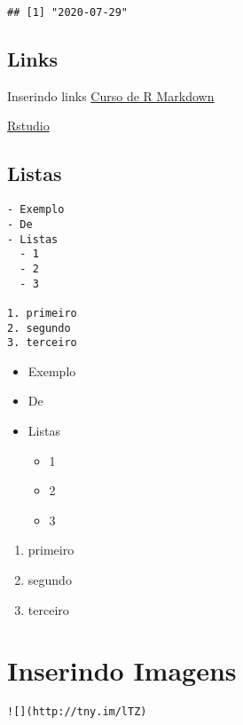 \documentclass[
]{book}
\providecommand{\tightlist}{%
  \setlength{\itemsep}{0pt}\setlength{\parskip}{0pt}}
\begin{document}
\begin{verbatim}
## [1] "2020-07-29"
\end{verbatim}

\hypertarget{links}{%
\subsection{Links}\label{links}}

Inserindo links \href{https://estatsej.github.io/curso_rmarkdown}{Curso de R Markdown}

\href{https://rstudio.com/}{Rstudio}

\hypertarget{listas}{%
\subsection{Listas}\label{listas}}

\begin{verbatim}
- Exemplo
- De
- Listas
  - 1
  - 2
  - 3
  
1. primeiro
2. segundo
3. terceiro
\end{verbatim}

\begin{itemize}
\tightlist
\item
  Exemplo
\item
  De
\item
  Listas

  \begin{itemize}
  \tightlist
  \item
    1
  \item
    2
  \item
    3
  \end{itemize}
\end{itemize}

\begin{enumerate}
\def\labelenumi{\arabic{enumi}.}
\tightlist
\item
  primeiro
\item
  segundo
\item
  terceiro
\end{enumerate}

\hypertarget{inserindo-imagens}{%
\section{Inserindo Imagens}\label{inserindo-imagens}}

\begin{verbatim}
![](http://tny.im/lTZ)
\end{verbatim}
\end{document}
